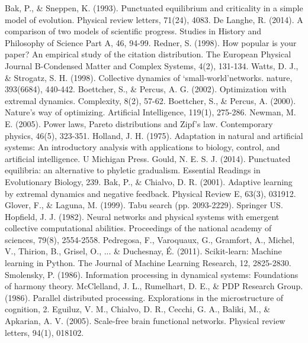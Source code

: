 \documentclass[12pt]{article}
\begin{document}
\begin{thebibliography}{99}
    Bak, P., \& Sneppen, K. (1993). Punctuated equilibrium and criticality in a simple model of evolution. Physical review letters, 71(24), 4083.
    De Langhe, R. (2014). A comparison of two models of scientific progress. Studies in History and Philosophy of Science Part A, 46, 94-99.
    Redner, S. (1998). How popular is your paper? An empirical study of the citation distribution. The European Physical Journal B-Condensed Matter and Complex Systems, 4(2), 131-134.
    Watts, D. J., \& Strogatz, S. H. (1998). Collective dynamics of ‘small-world’networks. nature, 393(6684), 440-442.
    Boettcher, S., \& Percus, A. G. (2002). Optimization with extremal dynamics. Complexity, 8(2), 57-62.
    Boettcher, S., \& Percus, A. (2000). Nature's way of optimizing. Artificial Intelligence, 119(1), 275-286.
    Newman, M. E. (2005). Power laws, Pareto distributions and Zipf's law. Contemporary physics, 46(5), 323-351.
    Holland, J. H. (1975). Adaptation in natural and artificial systems: An introductory analysis with applications to biology, control, and artificial intelligence. U Michigan Press.
    Gould, N. E. S. J. (2014). Punctuated equilibria: an alternative to phyletic gradualism. Essential Readings in Evolutionary Biology, 239.
    Bak, P., \& Chialvo, D. R. (2001). Adaptive learning by extremal dynamics and negative feedback. Physical Review E, 63(3), 031912.
    Glover, F., \& Laguna, M. (1999). Tabu search (pp. 2093-2229). Springer US.
    Hopfield, J. J. (1982). Neural networks and physical systems with emergent collective computational abilities. Proceedings of the national academy of sciences, 79(8), 2554-2558.
    Pedregosa, F., Varoquaux, G., Gramfort, A., Michel, V., Thirion, B., Grisel, O., ... \& Duchesnay, É. (2011). Scikit-learn: Machine learning in Python. The Journal of Machine Learning Research, 12, 2825-2830.
    Smolensky, P. (1986). Information processing in dynamical systems: Foundations of harmony theory.
    McClelland, J. L., Rumelhart, D. E., \& PDP Research Group. (1986). Parallel distributed processing. Explorations in the microstructure of cognition, 2.
    Eguiluz, V. M., Chialvo, D. R., Cecchi, G. A., Baliki, M., \& Apkarian, A. V. (2005). Scale-free brain functional networks. Physical review letters, 94(1), 018102.

\end{thebibliography}
\end{document}
